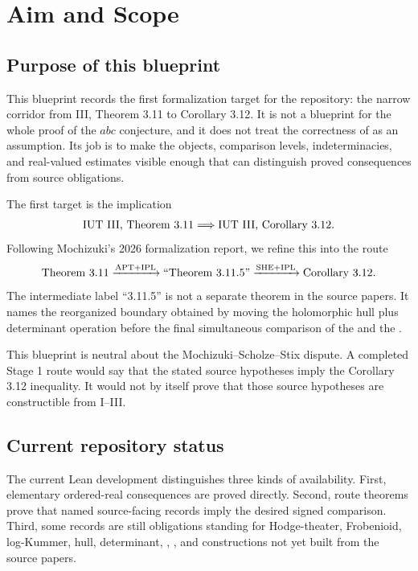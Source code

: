 \chapter{Aim and Scope}

\section{Purpose of this blueprint}

This blueprint records the first formalization target for the repository:
the narrow corridor from \IUT{} III, Theorem 3.11 to Corollary 3.12.
It is not a blueprint for the whole proof of the \(abc\) conjecture, and it
does not treat the correctness of \IUT{} as an assumption.  Its job is to make
the objects, comparison levels, indeterminacies, and real-valued estimates
visible enough that \leanfour{} can distinguish proved consequences from
source obligations.

\begin{definition}
  \label{def:stage1-target}
  \leanok
  The first target is the implication
  \[
    \text{IUT{} III, Theorem 3.11}
      \Longrightarrow
    \text{IUT{} III, Corollary 3.12}.
  \]
  Following Mochizuki's 2026 formalization report, we refine this into the
  route
  \[
    \text{Theorem 3.11}
      \xrightarrow{\mathrm{APT}+\mathrm{IPL}}
    \text{``Theorem 3.11.5''}
      \xrightarrow{\mathrm{SHE}+\mathrm{IPL}}
    \text{Corollary 3.12}.
  \]
  The intermediate label ``3.11.5'' is not a separate theorem in the source
  papers.  It names the reorganized boundary obtained by moving the
  holomorphic hull plus determinant operation before the final simultaneous
  comparison of the \ThetaPilot{} and the \qPilot{}.
\end{definition}

\begin{remark}
  \label{rem:neutrality}
  This blueprint is neutral about the Mochizuki--Scholze--Stix dispute.  A
  completed Stage 1 route would say that the stated source hypotheses imply
  the Corollary 3.12 inequality.  It would not by itself prove that those
  source hypotheses are constructible from \IUT{} I--III.
\end{remark}

\section{Current repository status}

\begin{proposition}
  \label{prop:availability-levels}
  The current Lean development distinguishes three kinds of availability.
  First, elementary ordered-real consequences are proved directly.  Second,
  route theorems prove that named source-facing records imply the desired
  signed comparison.  Third, some records are still obligations standing for
  Hodge-theater, Frobenioid, log-Kummer, hull, determinant, \SHE{}, \IPL{},
  and \APT{} constructions not yet built from the source papers.
\end{proposition}

